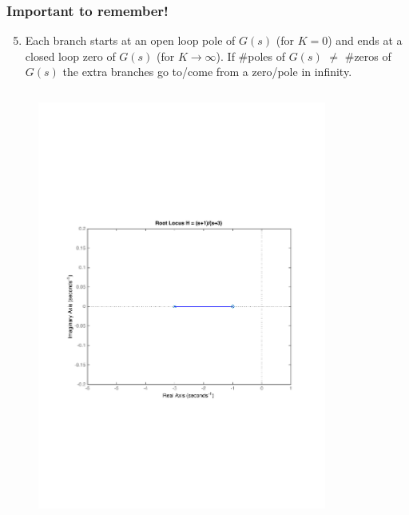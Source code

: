 \begin{frame}
\frametitle{Important to remember!}
	\begin{alertblock}{}
		\begin{enumerate}
		\setcounter{enumi}{4}
			\item Each branch starts at an open loop pole of $G(s)$ (for $K=0$) and ends at a closed loop zero of $G(s)$ (for $K \rightarrow \infty$). If $\#$poles of $G(s)$ $\neq$ $\#$zeros of $G(s)$ the extra branches go to/come from a zero/pole in infinity.
		\end{enumerate}
	\vspace{-1em}
	\begin{columns}
		\begin{column}{0.5\textwidth}
			\begin{figure}
				\centering
				\includegraphics[width=0.8\linewidth]{how_to_draw_easy_ex1}
			\end{figure}
		\end{column}
		\begin{column}{0.5\textwidth}
			\begin{figure}
				\centering

\end{figure}
\end{column}
\end{columns}
\end{alertblock}
\end{frame}
